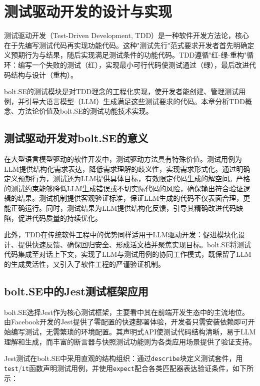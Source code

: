 
\chapter{测试驱动开发的设计与实现}
\label{chap:tdd}

测试驱动开发（Test-Driven Development, TDD）是一种软件开发方法论，核心在于先编写测试代码再实现功能代码。这种"测试先行"范式要求开发者首先明确定义预期行为与结果，随后实现满足测试条件的功能代码。TDD遵循"红-绿-重构"循环：编写一个失败的测试（红），实现最小可行代码使测试通过（绿），最后改进代码结构与设计（重构）。

bolt.SE的测试模块是对TDD理念的工程化实现，使开发者能创建、管理测试用例，并引导大语言模型（LLM）生成满足这些测试要求的代码。本章分析TDD概念、方法论价值及bolt.SE的测试功能技术实现。

\section{测试驱动开发对bolt.SE的意义}

在大型语言模型驱动的软件开发中，测试驱动方法具有特殊价值。测试用例为LLM提供结构化需求表达，降低需求理解的歧义性，实现需求形式化。通过明确定义预期行为，测试还为LLM提供具体目标，有效限定代码生成的解空间。严格的测试约束能够降低LLM生成错误或不切实际代码的风险，确保输出符合验证逻辑的结果。测试机制提供客观验证标准，保证LLM生成的代码不仅表面合理，更能正确运行。同时，测试结果为LLM提供结构化反馈，引导其精确改进代码缺陷，促进代码质量的持续优化。

此外，TDD在传统软件工程中的优势同样适用于LLM驱动开发：促进模块化设计、提供快速反馈、确保回归安全、形成活文档并聚焦实现目标。bolt.SE将测试代码集成至对话上下文，实现了LLM与测试用例的协同工作模式，既保留了LLM的生成灵活性，又引入了软件工程的严谨验证机制。

\section{bolt.SE中的Jest测试框架应用}

bolt.SE选择Jest作为核心测试框架，主要看中其在前端开发生态中的主流地位。由Facebook开发的Jest提供了零配置的快速部署体验，开发者只需安装依赖即可开始编写测试，无需繁琐的环境配置\cite{Jest2023}。其声明式API使测试代码结构清晰，易于LLM理解和生成，而丰富的断言器与快照测试功能则为各类应用场景提供了验证支持。

Jest测试在bolt.SE中采用直观的结构组织：通过\texttt{describe}块定义测试套件，用\texttt{test}/\texttt{it}函数声明测试用例，并使用\texttt{expect}配合各类匹配器表达验证条件，如下所示：

